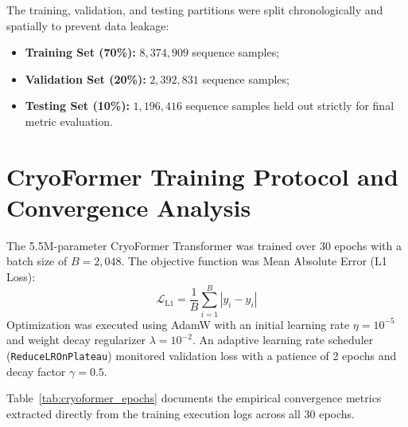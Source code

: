 \documentclass{mnnit}
\begin{document}
The training, validation, and testing partitions were split chronologically and spatially to prevent data leakage:
\begin{itemize}
    \item \textbf{Training Set (70\%):} $8,374,909$ sequence samples;
    \item \textbf{Validation Set (20\%):} $2,392,831$ sequence samples;
    \item \textbf{Testing Set (10\%):} $1,196,416$ sequence samples held out strictly for final metric evaluation.
\end{itemize}

\section{CryoFormer Training Protocol and Convergence Analysis}
The 5.5M-parameter CryoFormer Transformer was trained over 30 epochs with a batch size of $B = 2,048$. The objective function was Mean Absolute Error (L1 Loss):
\begin{equation}
    \mathcal{L}_{\text{L1}} = \frac{1}{B}\sum_{i=1}^B \left| y_i - \hat{y}_i \right|
\end{equation}
Optimization was executed using AdamW with an initial learning rate $\eta = 10^{-5}$ and weight decay regularizer $\lambda = 10^{-2}$. An adaptive learning rate scheduler (\texttt{ReduceLROnPlateau}) monitored validation loss with a patience of 2 epochs and decay factor $\gamma = 0.5$.

Table~\ref{tab:cryoformer_epochs} documents the empirical convergence metrics extracted directly from the training execution logs across all 30 epochs.
\end{document}
